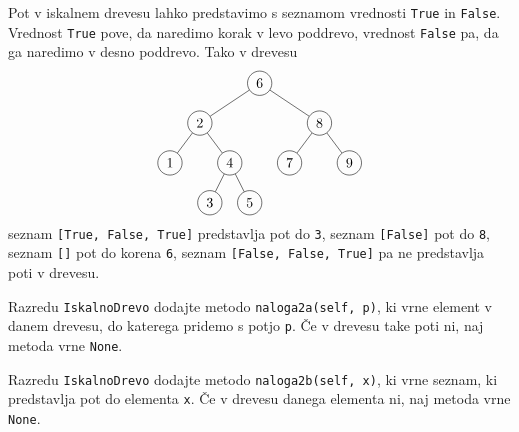\documentclass[arhiv]{izpit}
\begin{document}
Pot v iskalnem drevesu lahko predstavimo s seznamom vrednosti \verb|True| in \verb|False|.
Vrednost \verb|True| pove, da naredimo korak v levo poddrevo, vrednost \verb|False| pa, da ga naredimo v desno poddrevo.
Tako v drevesu
\[
  \begin{tikzpicture}[level distance=1cm,
    level 1/.style={sibling distance=3cm},
    level 2/.style={sibling distance=1.5cm},
    level 3/.style={sibling distance=1cm}
    ]
    \node[circle, draw] {6}
      child {node[circle, draw] {2}
        child {node[circle, draw] {1}}
        child {node[circle, draw] {4}
          child {node[circle, draw] {3}}
          child {node[circle, draw] {5}}
        }
      }
      child {node[circle, draw] {8}
      child {node[circle, draw] {7}}
        child {node[circle, draw] {9}}
      };
  \end{tikzpicture}
\]
seznam \verb|[True, False, True]| predstavlja pot do \verb|3|,
seznam \verb|[False]| pot do \verb|8|,
seznam \verb|[]| pot do korena \verb|6|,
seznam \verb|[False, False, True]| pa ne predstavlja poti v drevesu.

\podnaloga[10 točk]
%
Razredu \verb|IskalnoDrevo| dodajte metodo \verb|naloga2a(self, p)|, ki vrne element v danem drevesu, do katerega pridemo s potjo \verb|p|.
Če v drevesu take poti ni, naj metoda vrne \verb|None|.


\podnaloga[15 točk]
%
Razredu \verb|IskalnoDrevo| dodajte metodo \verb|naloga2b(self, x)|, ki vrne seznam,
ki predstavlja pot do elementa \verb|x|.
Če v drevesu danega elementa ni, naj metoda vrne \verb|None|.


\naloga[25 točk]
\end{document}
